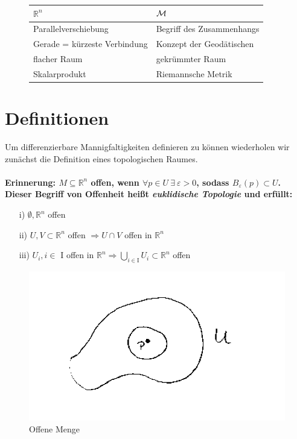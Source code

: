 \begin{figure}[H]
\centering
\begin{tabular}{>{\centering}p{} | >{\centering}p{}} 
$\mathbb{R}^n$ \vspace{5pt} & $\Huge\mathcal{M}$  \vspace{5pt} \tabularnewline \hline 
\vspace{5pt} Parallelverschiebung & \vspace{5pt} Begriff des Zusammenhangs\tabularnewline 
\vspace{5pt} Gerade = kürzeste Verbindung & \vspace{5pt} Konzept der Geodätischen \tabularnewline 
\vspace{5pt} flacher Raum & \vspace{5pt} gekrümmter Raum \tabularnewline 
\vspace{5pt} Skalarprodukt & \vspace{5pt} Riemannsche Metrik \tabularnewline 
\end{tabular}
\end{figure}
\section{Definitionen}
Um differenzierbare Mannigfaltigkeiten definieren zu können wiederholen wir zunächst die Definition eines topologischen Raumes. \\
\phantom{.}\\
\bfseries Erinnerung: \normalfont $M \subseteq \mathbb{R}^n$ offen, wenn $\forall p \in U \ \exists \ \varepsilon>0$, sodass $B_{\varepsilon}(p) \subset U$. Dieser Begriff von Offenheit heißt \textit{euklidische Topologie} \normalfont und erfüllt:
\begin{enumerate}
\item[i)] $\emptyset, \mathbb{R}^n$ offen
\item[ii)] $U, V \subset \mathbb{R}^n$ offen $\Rightarrow U \cap V$ offen in $\mathbb{R}^n$
\item [iii)] $U_i, i \in $ I offen in $\mathbb{R}^n \Rightarrow \bigcup\limits_{i \in \text{I}} U_i \subset \mathbb{R}^n$ offen
\end{enumerate} 

\begin{figure}[h]
\centering
\includegraphics[width=0.4\linewidth]{figures/scan/offenemenge.png}
\caption{Offene Menge}
\label{img:offenemenge}
\end{figure} 

